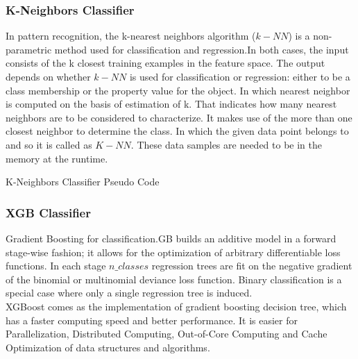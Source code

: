 \documentclass[sigconf]{acmart}
\begin{document}
\subsubsection{K-Neighbors Classifier}
In pattern recognition, the k-nearest neighbors algorithm ($k-NN$) is a non-parametric method used for classification and regression.In both cases, the input consists of the k closest training examples in the feature space. The output depends on whether $k-NN$ is used for classification or regression: either to be a class membership or the property value for the object. In which nearest neighbor is computed on the basis of estimation of k. That indicates how many nearest neighbors are to be considered to characterize. It makes use of the more than one closest neighbor to determine the class. In which the given data point belongs to and so it is called as $K-NN$. These data samples are needed to be in the memory at the runtime. \\
    \begin{algorithm}  
        \caption{K-Neighbors Classifier Pseudo Code}  
        \begin{algorithmic}[H]
            
            \ENDFOR
            \end{algorithmic}  
    \end{algorithm}  
\subsubsection{XGB Classifier}
Gradient Boosting for classification.GB builds an additive model in a forward stage-wise fashion; it allows for the optimization of arbitrary differentiable loss functions. In each stage $n\_classes$ regression trees are fit on the negative gradient of the binomial or multinomial deviance loss function. Binary classification is a special case where only a single regression tree is induced.\\
\indent
XGBoost comes as the implementation of gradient boosting decision tree, which has a faster computing speed and better performance. It is easier for Parallelization, Distributed Computing, Out-of-Core Computing and Cache Optimization of data structures and algorithms.
\end{document}
